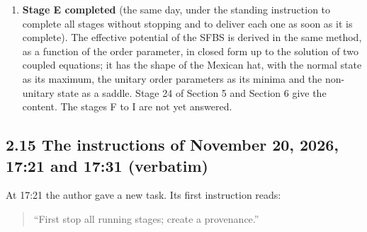 \documentclass[
  10pt,
]{article}
\begin{document}
\begin{enumerate}
  the critical coupling for the mass 0.2 is 32.3506 instead of 21.28661;
  and the vacuum at the coupling 22.5 of Test 2 is normal. They are
  resolved, every step with a proof and a check by machine: (i) the
  shift of the chemical potential is the effect of the order of the
  factors of the interaction, fixed by the charge conjugation; (ii) the
  interaction is normal-ordered with respect to the normal correlations
  of the vacuum, which is the same as a counterterm for the mass, and
  with it the vacuum, its gap equation, the critical coupling and the
  SFBS boson are exactly those of items {[}7{]} to {[}11{]}; (iii) an
  alternative that changes the interaction (its axially symmetric
  completion) removes the dressing of the mass for every state and is
  recorded, not adopted; (iv) it is proved that no contact interaction
  is free of normal contractions in every state, so that a subtraction
  at the vacuum is all that can be done. What remains different after
  (ii) is of the second order about the vacuum and is a result, not an
  issue. Stage 23 of Section 5 and Section 6 give the content; deviation
  D23 of Section 7 and the decisions 10 and 11 of Section 8 state what
  was chosen.
\item
  \textbf{Stage E completed} (the same day, under the standing
  instruction to complete all stages without stopping and to deliver
  each one as soon as it is complete). The effective potential of the
  SFBS is derived in the same method, as a function of the order
  parameter, in closed form up to the solution of two coupled equations;
  it has the shape of the Mexican hat, with the normal state as its
  maximum, the unitary order parameters as its minima and the
  non-unitary state as a saddle. Stage 24 of Section 5 and Section 6
  give the content. The stages F to I are not yet answered.
\end{enumerate}

\hypertarget{the-instructions-of-november-20-2026-1721-and-1731-verbatim}{%
\subsection{2.15 The instructions of November 20, 2026, 17:21 and 17:31
(verbatim)}\label{the-instructions-of-november-20-2026-1721-and-1731-verbatim}}

At 17:21 the author gave a new task. Its first instruction reads:

\begin{quote}
``First stop all running stages; create a provenance.''
\end{quote}
\end{document}
